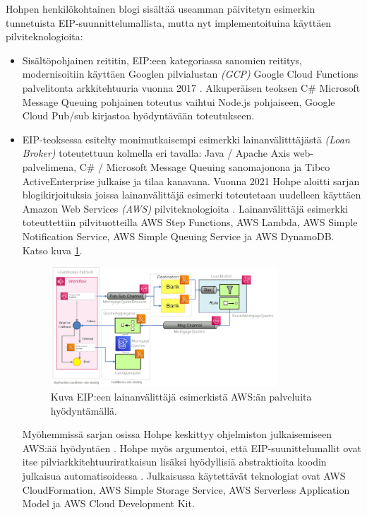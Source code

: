    Hohpen henkilökohtainen blogi sisältää useamman päivitetyn esimerkin tunnetuista EIP-suunnittelumallista, mutta nyt implementoituina käyttäen pilviteknologioita: 
   \begin{itemize}
      \item Sisältöpohjainen reititin, EIP:een kategoriassa sanomien reititys, modernisoitiin käyttäen Googlen pilvialustan \textit{(GCP)} Google Cloud Functions palvelitonta arkkitehtuuria vuonna 2017 \citep{HohpeEIPGCP}. Alkuperäisen teoksen C\# Microsoft Message Queuing pohjainen toteutus vaihtui Node.js pohjaiseen, Google Cloud Pub/sub kirjastoa hyödyntävään toteutukseen.
   \item EIP-teoksessa esitelty monimutkaisempi esimerkki lainanvälitttäjästä \textit{(Loan Broker)} \citep[sivu~317]{Hohpe2004} toteutettuun kolmella eri tavalla: Java / Apache Axis web-palvelimena, C\# / Microsoft Message Queuing sanomajonona ja Tibco ActiveEnterprise julkaise ja tilaa kanavana. Vuonna 2021 Hohpe aloitti sarjan blogikirjoituksia joissa lainanvälittäjä esimerki toteutetaan uudelleen käyttäen Amazon Web Services \textit{(AWS)} pilviteknologioita \citep{HohpeLoanAWS}.
      Lainanvälittäjä esimerkki toteuttettiin pilvituotteilla AWS Step Functions, AWS Lambda, AWS Simple Notification Service, AWS Simple Queuing Service ja AWS DynamoDB. Katso kuva \ref{fig:hohpe_loanbroker_4}.

      \begin{figure}[h]
      \begin{center}
      \includegraphics[width=0.8\textwidth]{kuvat/hohpe_loanbroker_4.png}
      \caption{Kuva EIP:een lainanvälittäjä esimerkistä AWS:än palveluita hyödyntämällä.  \citep{HohpeLoanAWS_4}\label{fig:hohpe_loanbroker_4}}
      \end{center}
      \end{figure}


      Myöhemmissä sarjan osissa Hohpe keskittyy ohjelmiston julkaisemiseen AWS:ää hyödyntäen \citep{HohpeLoanAWS_4} \citep{HohpeLoanAWS_5}. Hohpe myös argumentoi, että EIP-suunittelumallit ovat itse pilviarkkitehtuuriratkaisun lisäksi hyödyllisiä abstraktioita koodin julkaisua automatisoidessa \citep{HohpeLoanAWS_5}. Julkaisussa käytettävät teknologiat ovat AWS CloudFormation, AWS Simple Storage Service, AWS Serverless Application Model ja AWS Cloud Development Kit.


\end{itemize}
